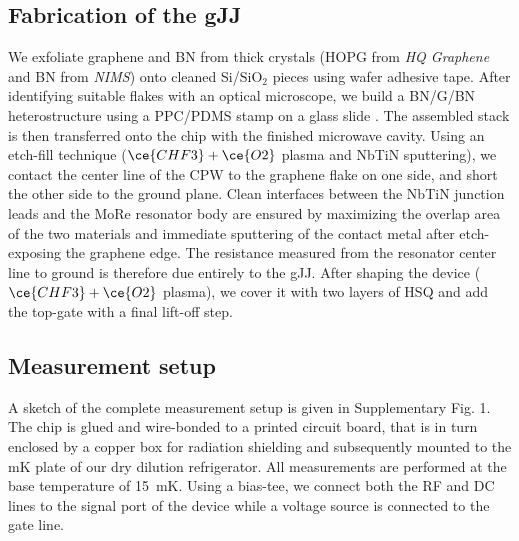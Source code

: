 \subsection{Fabrication of the gJJ}
We exfoliate graphene and BN from thick crystals (HOPG from \textit{HQ Graphene} and BN from \textit{NIMS}\cite{taniguchiSynthesisHighpurityBoron2007}) onto cleaned Si/$\mathrm{SiO_2}$ pieces using wafer adhesive tape.
After identifying suitable flakes with an optical microscope, we build a BN/G/BN heterostructure using a PPC/PDMS stamp on a glass slide \cite{pizzoccheroHotPickupTechnique2016a,wangOneDimensionalElectricalContact2013b}.
The assembled stack is then transferred onto the chip with the finished microwave cavity.
Using an etch-fill technique ($\ce{CHF3} + \ce{O2}$ plasma and NbTiN sputtering), we contact the center line of the CPW to the graphene flake on one side, and short the other side to the ground plane.
Clean interfaces between the NbTiN junction leads and the MoRe resonator body are ensured by maximizing the overlap area of the two materials and immediate sputtering of the contact metal after etch-exposing the graphene edge.
The resistance measured from the resonator center line to ground is therefore due entirely to the gJJ.
After shaping the device ($\ce{CHF3} + \ce{O2}$ plasma), we cover it with two layers of HSQ \cite{nandaCurrentPhaseRelationBallistic2017} and add the top-gate with a final lift-off step.

\subsection{Measurement setup}\label{sec:setup}
\noindent A sketch of the complete measurement setup is given in Supplementary Fig. 1.
The chip is glued and wire-bonded to a printed circuit board, that is in turn enclosed by a copper box for radiation shielding and subsequently mounted to the mK plate of our dry dilution refrigerator.
All measurements are performed at the base temperature of \SI{15}{mK}.
Using a bias-tee, we connect both the RF and DC lines to the signal port of the device while a voltage source is connected to the gate line.

